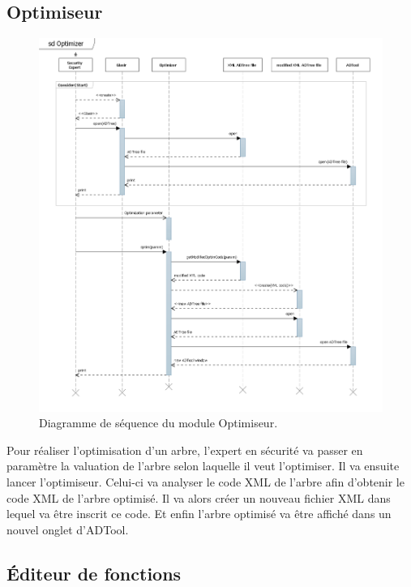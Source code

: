 	\subsection{Optimiseur}

	    \begin{figure}[H]
	        \centering
	        \includegraphics[height=1\textwidth]{figure/Optim.png}
	        \caption{Diagramme de séquence du module Optimiseur.}
	        \label{fig:optim}
	    \end{figure}

Pour réaliser l'optimisation d'un arbre, l'expert en sécurité va passer en paramètre la valuation de l'arbre selon laquelle il veut l'optimiser. Il va ensuite lancer l'optimiseur. Celui-ci va analyser le code XML de l'arbre afin d'obtenir le code XML de l'arbre optimisé. Il va alors créer un nouveau fichier XML dans lequel va être inscrit ce code. Et enfin l'arbre optimisé va être affiché dans un nouvel onglet d'ADTool.

	\subsection{Éditeur de fonctions}

